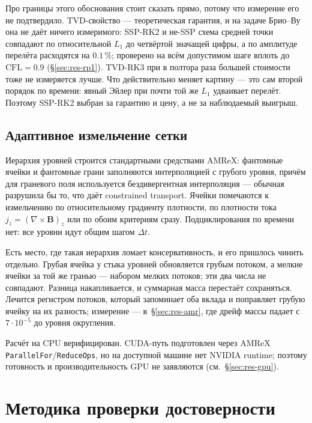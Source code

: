 \documentclass[12pt,a4paper]{article}
\newcommand{\B}{\mathbf{B}}
\newcommand{\code}[1]{\texttt{#1}}
\begin{document}
Про границы этого обоснования стоит сказать прямо, потому что измерение его не
подтвердило. TVD-свойство — теоретическая гарантия, и на задаче Брио--Ву она не
даёт ничего измеримого: SSP-RK2 и не-SSP схема средней точки совпадают по
относительной $L_1$ до четвёртой значащей цифры, а по амплитуде перелёта
расходятся на $0.1\,\%$; проверено на всём допустимом шаге вплоть до
$\mathrm{CFL}=0.9$ (\S\ref{sec:res-rp1}). TVD-RK3 при в полтора раза большей
стоимости тоже не измеряется лучше. Что действительно меняет картину — это сам
второй порядок по времени: явный Эйлер при почти той же $L_1$ удваивает перелёт.
Поэтому SSP-RK2 выбран за гарантию и цену, а не за наблюдаемый выигрыш.

\subsection{Адаптивное измельчение сетки}

Иерархия уровней строится стандартными средствами AMReX: фантомные ячейки и
фантомные грани заполняются интерполяцией с грубого уровня, причём для
граневого поля используется бездивергентная интерполяция — обычная разрушила бы
то, что даёт constrained transport. Ячейки помечаются к измельчению по
относительному градиенту плотности, по плотности тока $j_z=(\nabla\times\B)_z$
или по обоим критериям сразу. Подциклирования по времени нет: все уровни идут
общим шагом $\Delta t$.

Есть место, где такая иерархия ломает консервативность, и его пришлось чинить
отдельно. Грубая ячейка у стыка уровней обновляется грубым потоком, а мелкие
ячейки за той же гранью — набором мелких потоков; эти два числа не совпадают.
Разница накапливается, и суммарная масса перестаёт сохраняться. Лечится
регистром потоков, который запоминает оба вклада и поправляет грубую ячейку на
их разность; измерение — в~\S\ref{sec:res-amr}, где дрейф массы падает с
$7\!\cdot\!10^{-5}$ до уровня округления.

Расчёт на CPU верифицирован. CUDA-путь подготовлен через AMReX
\code{ParallelFor}/\code{ReduceOps}, но на доступной машине нет NVIDIA runtime;
поэтому готовность и производительность GPU не заявляются
(см.~\S\ref{sec:res-gpu}).

\section{Методика проверки достоверности}
\label{sec:vv}
\end{document}
